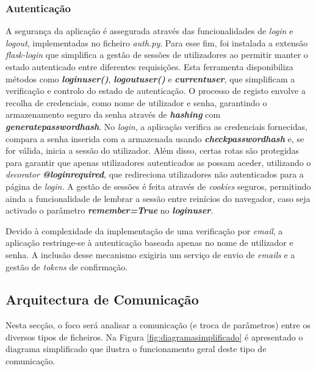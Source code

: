 \subsubsection{Autenticação}
A segurança da aplicação é assegurada através das funcionalidades de \textit{login} e \textit{logout}, implementadas no ficheiro \textit{auth.py}. Para esse fim, foi instalada a extensão \textit{flask-login} que simplifica a gestão de sessões de utilizadores ao permitir manter o estado autenticado entre diferentes requisições. Esta ferramenta disponibiliza métodos como \textbf{\textit{login\textunderscore user()}}, \textbf{\textit{logout\textunderscore user()}} e \textbf{\textit{current\textunderscore user}}, que simplificam a verificação e controlo do estado de autenticação. O processo de registo envolve a recolha de credenciais, como nome de utilizador e senha, garantindo o armazenamento seguro da senha através de \textbf{\textit{hashing}} com \textbf{\textit{generate\textunderscore password\textunderscore hash}}. No \textit{login}, a aplicação verifica as credenciais fornecidas, compara a senha inserida com a armazenada usando \textbf{\textit{check\textunderscore password\textunderscore hash}} e, se for válida, inicia a sessão do utilizador. Além disso, certas rotas são protegidas para garantir que apenas utilizadores autenticados as possam aceder, utilizando o \textit{decorator} \textbf{\textit{@login\textunderscore required}}, que redireciona utilizadores não autenticados para a página de \textit{login}. A gestão de sessões é feita através de \textit{cookies} seguros, permitindo ainda a funcionalidade de lembrar a sessão entre reinícios do navegador, caso seja activado o parâmetro \textbf{\textit{remember=True}} no \textbf{\textit{login\textunderscore user}}. 

Devido à complexidade da implementação de uma verificação por \textit{email}, a aplicação restringe-se à autenticação baseada apenas no nome de utilizador e senha. A inclusão desse mecanismo exigiria um serviço de envio de \textit{emails} e a gestão de \textit{tokens} de confirmação.

\subsection{Arquitectura de Comunicação}
\label{sec:comunicacao}
Nesta secção, o foco será analisar a comunicação (e troca de parâmetros) entre os diversos tipos de ficheiros. Na Figura \ref{fig:diagramasimplificado} é apresentado o diagrama simplificado que ilustra o funcionamento geral deste tipo de comunicação. 

